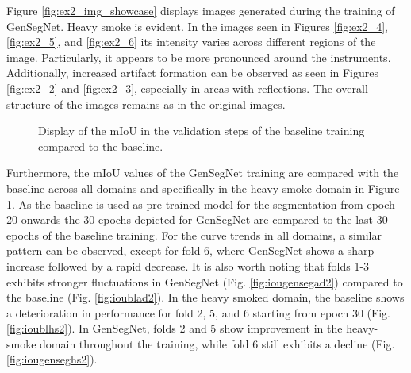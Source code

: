 Figure \ref{fig:ex2_img_showcase} displays images generated during the training of GenSegNet. 
Heavy smoke is evident.
In the images seen in Figures \ref{fig:ex2_4}, \ref{fig:ex2_5}, and \ref{fig:ex2_6} its intensity varies across different regions of the image. 
Particularly, it appears to be more pronounced around the instruments. 
Additionally, increased artifact formation can be observed as seen in Figures \ref{fig:ex2_2} and \ref{fig:ex2_3}, especially in areas with reflections.
The overall structure of the images remains as in the original images.\\
\begin{figure}[bt]
    \centering
    \hfill
    
    \vspace{0.5cm}
    
    \hfill
    
    \caption[Comparison of mIoU in GenSegNet]{Display of the mIoU in the validation steps of the baseline training compared to the baseline.}\label{fig:segment_bl_comp}
\end{figure}
Furthermore, the mIoU values of the GenSegNet training are compared with the baseline across all domains and specifically in the heavy-smoke domain in Figure \ref{fig:segment_bl_comp}.
As the baseline is used as pre-trained model for the segmentation from epoch 20 onwards the 30 epochs depicted for GenSegNet are compared to the last 30 epochs of the baseline training.
For the curve trends in all domains, a similar pattern can be observed, except for fold 6, where GenSegNet shows a sharp increase followed by a rapid decrease.
It is also worth noting that folds 1-3 exhibits stronger fluctuations in GenSegNet (Fig. \ref{fig:iougensegad2}) compared to the baseline (Fig. \ref{fig:ioublad2}).
In the heavy smoked domain, the baseline shows a deterioration in performance for fold 2, 5, and 6 starting from epoch 30 (Fig. \ref{fig:ioublhs2}).
In GenSegNet, folds 2 and 5 show improvement in the heavy-smoke domain throughout the training, while fold 6 still exhibits a decline (Fig. \ref{fig:iougenseghs2}). 
